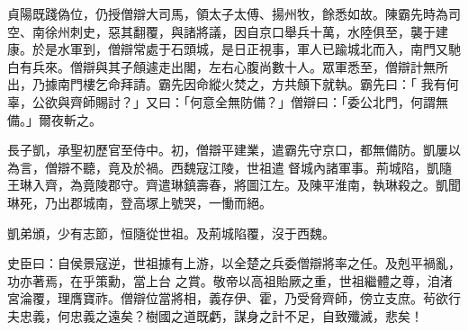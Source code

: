 \begin{pinyinscope}
 貞陽既踐偽位，仍授僧辯大司馬，領太子太傅、揚州牧，餘悉如故。陳霸先時為司空、南徐州刺史，惡其翻覆，與諸將議，因自京口舉兵十萬，水陸俱至，襲于建康。於是水軍到，僧辯常處于石頭城，是日正視事，軍人已踰城北而入，南門又馳白有兵來。僧辯與其子頠遽走出閣，左右心腹尚數十人。眾軍悉至，僧辯計無所出，乃據南門樓乞命拜請。霸先因命縱火焚之，方共頠下就執。霸先曰：「
 我有何辜，公欲與齊師賜討？」又曰：「何意全無防備？」僧辯曰：「委公北門，何謂無備。」爾夜斬之。



 長子凱，承聖初歷官至侍中。初，僧辯平建業，遣霸先守京口，都無備防。凱屢以為言，僧辯不聽，竟及於禍。西魏寇江陵，世祖遣督城內諸軍事。荊城陷，凱隨王琳入齊，為竟陵郡守。齊遣琳鎮壽春，將圖江左。及陳平淮南，執琳殺之。凱聞琳死，乃出郡城南，登高塚上號哭，一慟而絕。



 凱弟頒，少有志節，恒隨從世祖。及荊城陷覆，沒于西魏。



 史臣曰：自侯景寇逆，世祖據有上游，以全楚之兵委僧辯將率之任。及剋平禍亂，功亦著焉，在乎策勳，當上台
 之賞。敬帝以高祖貽厥之重，世祖繼體之尊，洎渚宮淪覆，理膺寶祚。僧辯位當將相，義存伊、霍，乃受脅齊師，傍立支庶。茍欲行夫忠義，何忠義之遠矣？樹國之道既虧，謀身之計不足，自致殲滅，悲矣！



\end{pinyinscope}
